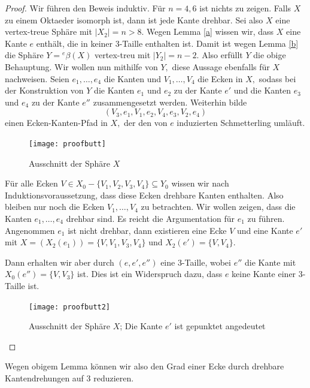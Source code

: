 \documentclass[12pt,titlepage,twoside,cleardoublepage]{article}
\theoremstyle{nummermitklammern}
\numberwithin{equation}{section}
\begin{document}
  \begin{proof}
  Wir führen den Beweis induktiv. Für $n=4,6$ ist nichts zu zeigen. Falls $X$ zu einem Oktaeder isomorph ist, dann ist jede Kante drehbar. Sei also $X$ eine vertex-treue Sphäre mit $\vert X_2 \vert =n>8.$ Wegen Lemma \ref{a} wissen wir, dass $X$ eine Kante $e$ enthält, die in keiner 3-Taille enthalten ist. Damit ist wegen Lemma \ref{b} die Sphäre $Y={}^e\beta(X)$  vertex-treu mit $\vert Y_2\vert =n-2.$ Also erfüllt $Y$ die obige Behauptung. Wir wollen nun mithilfe von $Y,$ diese Aussage ebenfalls für $X$ nachweisen.
Seien $e_1,\ldots,e_4$ die Kanten und $V_1,\ldots, V_4$ die Ecken in $X,$ sodass bei der Konstruktion von $Y$ die Kanten $e_1$ und $e_2$ zu der Kante $e'$ und die Kanten $e_3$ und $e_4$ zu der Kante $e''$ zusammengesetzt werden. Weiterhin bilde 
\[
(V_3,e_1,V_1,e_2,V_4,e_3,V_2,e_4)
\]  
einen Ecken-Kanten-Pfad in $X,$ der den von $e$ induzierten Schmetterling umläuft.
 \begin{figure}[H]
\begin{center}
\texttt{[image: proofbutt]}
\end{center}
\caption{Ausschnitt der Sphäre $X$}
\end{figure}
 Für alle Ecken $V\in X_0-\{V_1,V_2,V_3,V_4\}\subseteq Y_0$ wissen wir nach Induktionsvoraussetzung, dass diese Ecken drehbare Kanten enthalten. Also bleiben nur noch die Ecken $V_1,\ldots,V_4$ zu betrachten. Wir wollen zeigen, dass die Kanten $e_1,\ldots,e_4$ drehbar sind. Es reicht die Argumentation für $e_1$ zu führen. Angenommen $e_1$ ist nicht drehbar, dann existieren eine Ecke $V$ und eine Kante $e'$ mit $X=(X_2(e_1))=\{V,V_1,V_3,V_4\}$ und $X_2(e')=\{V,V_4\}.$
 

Dann erhalten wir aber durch $(e,e',e'')$ eine 3-Taille, wobei $e''$ die Kante mit $X_0(e'')=\{V,V_3\}$ ist. Dies ist ein Widerspruch dazu, dass $e$ keine Kante einer 3-Taille ist.
 \begin{figure}[H]
\begin{center}
\texttt{[image: proofbutt2]}
\end{center}
\caption{Ausschnitt der Sphäre $X$; Die Kante $e'$ ist gepunktet angedeutet}
\end{figure}
  \end{proof}
  Wegen obigem Lemma können wir also den Grad einer Ecke durch drehbare Kantendrehungen auf 3 reduzieren.
\end{document}
